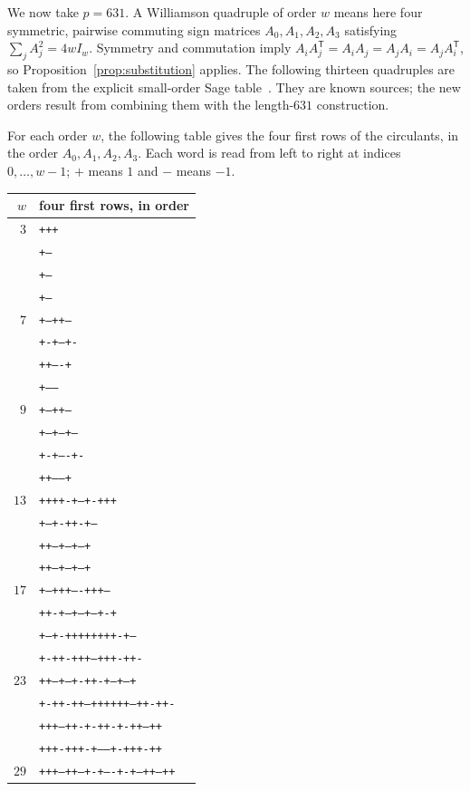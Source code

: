 \documentclass[10pt]{article}
\begin{document}
We now take $p=631$. A Williamson quadruple of order $w$ means here four
symmetric, pairwise commuting sign matrices $A_0,A_1,A_2,A_3$ satisfying
$\sum_j A_j^2=4wI_w$. Symmetry and commutation imply
$A_iA_j^{\mathsf T}=A_iA_j=A_jA_i=A_jA_i^{\mathsf T}$, so
Proposition~\ref{prop:substitution} applies.
The following thirteen quadruples are taken from the explicit small-order
Sage table~\cite{sage}. They are known sources; the new orders result from
combining them with the length-$631$ construction.

For each order $w$, the following table gives the four first rows of the
circulants, in the order $A_0,A_1,A_2,A_3$.
Each word is read from left to right at indices $0,\ldots,w-1$;
$+$ means $1$ and $-$ means $-1$.
\begin{center}\scriptsize
\begin{tabular}{rl}
$w$&four first rows, in order\\\hline
$3$&\texttt{+++}\\
&\texttt{+--}\\
&\texttt{+--}\\
&\texttt{+--}\\
\hline
$7$&\texttt{+--++--}\\
&\texttt{+-+--+-}\\
&\texttt{++----+}\\
&\texttt{+------}\\
\hline
$9$&\texttt{+---++---}\\
&\texttt{+--+--+--}\\
&\texttt{+-+----+-}\\
&\texttt{++------+}\\
\hline
$13$&\texttt{++++-+--+-+++}\\
&\texttt{+---+-++-+---}\\
&\texttt{++---+--+---+}\\
&\texttt{++---+--+---+}\\
\hline
$17$&\texttt{+---+++----+++---}\\
&\texttt{++-+---+--+---+-+}\\
&\texttt{+--+-++++++++-+--}\\
&\texttt{+-++-+++--+++-++-}\\
\hline
$23$&\texttt{++---+---+-++-+---+---+}\\
&\texttt{+-++-++--++++++--++-++-}\\
&\texttt{+++---++-+-++-+-++---++}\\
&\texttt{+++-+++-+------+-+++-++}\\
\hline
$29$&\texttt{+++---++--+-+----+-+--++---++}\\

\end{tabular}
\end{center}
\end{document}
